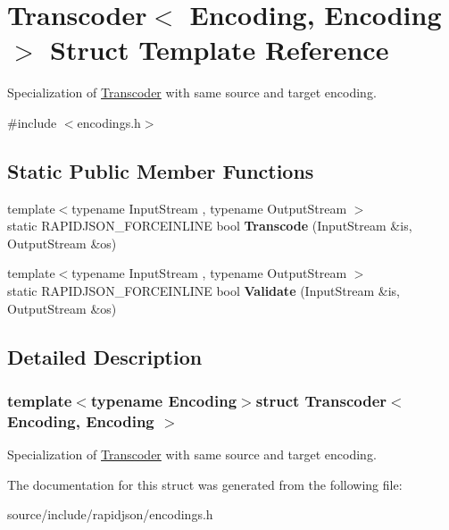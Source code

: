 \hypertarget{struct_transcoder_3_01_encoding_00_01_encoding_01_4}{}\section{Transcoder$<$ Encoding, Encoding $>$ Struct Template Reference}
\label{struct_transcoder_3_01_encoding_00_01_encoding_01_4}


Specialization of \hyperlink{struct_transcoder}{Transcoder} with same source and target encoding.  




{\ttfamily \#include $<$encodings.\+h$>$}

\subsection*{Static Public Member Functions}
\begin{DoxyCompactItemize}
\item 
\hypertarget{struct_transcoder_3_01_encoding_00_01_encoding_01_4_aad11cdc2b829123a7b9969e34d456813}{}{\footnotesize template$<$typename Input\+Stream , typename Output\+Stream $>$ }\\static R\+A\+P\+I\+D\+J\+S\+O\+N\+\_\+\+F\+O\+R\+C\+E\+I\+N\+L\+I\+N\+E bool {\bfseries Transcode} (Input\+Stream \&is, Output\+Stream \&os)\label{struct_transcoder_3_01_encoding_00_01_encoding_01_4_aad11cdc2b829123a7b9969e34d456813}

\item 
\hypertarget{struct_transcoder_3_01_encoding_00_01_encoding_01_4_a536aa3930251161d05e112947ec2f9c8}{}{\footnotesize template$<$typename Input\+Stream , typename Output\+Stream $>$ }\\static R\+A\+P\+I\+D\+J\+S\+O\+N\+\_\+\+F\+O\+R\+C\+E\+I\+N\+L\+I\+N\+E bool {\bfseries Validate} (Input\+Stream \&is, Output\+Stream \&os)\label{struct_transcoder_3_01_encoding_00_01_encoding_01_4_a536aa3930251161d05e112947ec2f9c8}

\end{DoxyCompactItemize}


\subsection{Detailed Description}
\subsubsection*{template$<$typename Encoding$>$struct Transcoder$<$ Encoding, Encoding $>$}

Specialization of \hyperlink{struct_transcoder}{Transcoder} with same source and target encoding. 

The documentation for this struct was generated from the following file\+:\begin{DoxyCompactItemize}
\item 
source/include/rapidjson/encodings.\+h\end{DoxyCompactItemize}
